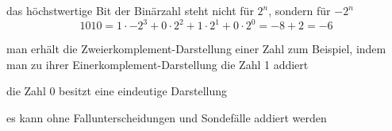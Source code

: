 \documentclass
[
  draft    = true,
  fontsize = 11pt,
  parskip  = half-,
  BCOR     = 0pt,
  DIV      = 11,
  ngerman,
  dvipsnames
]
{scrartcl}
\begin{document}
\begin{mytemize}
\begin{achim}
\begin{mytemize}
\begin{mytemize}
                    \item das höchstwertige Bit der Binärzahl steht nicht für $2^n$, sondern für $-2^n$
                          \begin{equation*}
                            1010=1\cdot-2^3+0\cdot2^2+1\cdot2^1+0\cdot2^0=-8+2=-6
                          \end{equation*}
                    \item man erhält die Zweierkomplement-Darstellung einer Zahl zum Beispiel, indem man zu ihrer
                          Einerkomplement-Darstellung die Zahl 1 addiert
                    \item die Zahl 0 besitzt eine eindeutige Darstellung
                    \item es kann ohne Fallunterscheidungen und Sondefälle addiert werden
                  \end{mytemize}
          \end{mytemize}
        \end{achim}
\end{mytemize}

\end{document}
